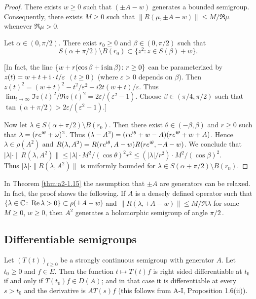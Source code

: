 \begin{proof}
There exists $w \geq 0$ such that $(\pm A - w)$ generates a bounded semigroup.
Consequently, there exists $M \geq 0$ such that $\|R(\mu,\pm A - w)\| \leq M/\Re\mu$ whenever $\Re\mu > 0$.

Let $\alpha \in (0,\pi/2)$.
There exist $r_0 \geq 0$ and $\beta \in (0,\pi/2)$ such that
\[
    S(\alpha+\pi/2)\setminus B(r_{0}) \subset \{ z^2 \colon z \in S(\beta) + w \}.
\]

[In fact, the line $\{w + r(\cos\beta + \mathrm{i} \sin\beta) \colon r \geq 0\}$ can be parameterized by $z(t) = w + t + \mathrm{i}\cdot t/\varepsilon$ $(t \geq 0)$ 
(where $\varepsilon > 0$ depends on $\beta$).
Then $z(t)^2 = (w + t)^2 - t^2/\varepsilon^2 + i2t(w+t)/\varepsilon$.
Thus $\lim_{t \to \infty} \Im z(t)^2/\Re z(t)^2 = 2\varepsilon/(\varepsilon^2-1)$.
Choose $\beta \in (\pi/4,\pi/2)$ such that $\tan(\alpha + \pi/2) > 2\varepsilon/(\varepsilon^2-1)$.]

Now let $\lambda \in S(\alpha+\pi/2)\setminus B(r_{0})$.
Then there exist $\theta \in (-\beta,\beta)$ 
and $r \geq 0$
such that $\lambda = (re^{\mathrm{i}\theta}+\omega)^2$.
Thus $(\lambda-A^2) = (re^{\mathrm{i}\theta}+w - A)(re^{\mathrm{i}\theta}+w + A)$.
Hence $\lambda \in \rho(A^2)$ and $R(\lambda,A^2) = R(re^{\mathrm{i}\theta},A-w)R(re^{\mathrm{i}\theta},-A-w)$.
We conclude that 
$|\lambda| \cdot \|R(\lambda,A^2)\| \leq |\lambda| \cdot M^2/(\cos\theta)^2r^2 \leq (|\lambda|/r^2)\cdot M^2/(\cos\beta)^2$. \\
Thus $|\lambda| \cdot \|R(\lambda,A^2)\|$ is uniformly bounded for $\lambda \in S(\alpha+\pi/2) \setminus B(r_0)$.
\end{proof}
\begin{remark*}\label{rem:a2-1.7-kgk}
In Theorem  \ref{thm:a2-1.15}  
the assumption that $\pm A$ are generators can be relaxed.
In fact, the proof shows the following.
If $A$ is a densely defined operator such that 
$\{\lambda \in \mathbb{C} \colon \mathop{}\!\mathrm{Re}\,\lambda > 0\} \subset \rho(\pm A - w)$ and 
$\|R(\lambda,\pm A - w)\| \leq M/\Re\lambda$ for some $M \geq 0$, $w \geq 0$, then $A^2$ generates a holomorphic semigroup of angle $\pi/2$\,.
\end{remark*}

\subsection{Differentiable semigroups} \label{subsec:a2-1.se5}
Let $(T(t))_{t\geq 0}$ be a strongly continuous semigroup with generator $A$.
Let $t_0 \geq 0$ and $f \in E$.
Then the function $t \mapsto T(t)f$ is right sided differentiable at $t_0$ if and only if $T(t_0)f \in D(A)$; and in that case it is differentiable at every $s > t_0$ and the derivative is $AT(s)f$ (this follows from A-I, Proposition 1.6(ii)).

